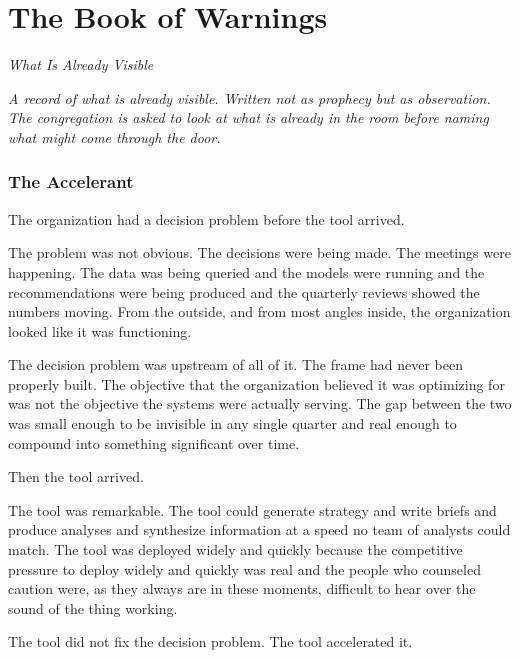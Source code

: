\chapter{The Book of Warnings}
\begin{center}
  \small\itshape What Is Already Visible
\end{center}
\vspace{0.5em}
\begin{center}
  \itshape A record of what is already visible. Written not as prophecy but as observation.\\
  The congregation is asked to look at what is already in the room before naming what might come through the door.
\end{center}
\vspace{2em}

\subsection*{The Accelerant}

The organization had a decision problem before the tool arrived.

The problem was not obvious. The decisions were being made. The meetings were happening. The data was being queried and the models were running and the recommendations were being produced and the quarterly reviews showed the numbers moving. From the outside, and from most angles inside, the organization looked like it was functioning.

The decision problem was upstream of all of it. The frame had never been properly built. The objective that the organization believed it was optimizing for was not the objective the systems were actually serving. The gap between the two was small enough to be invisible in any single quarter and real enough to compound into something significant over time.

Then the tool arrived.

The tool was remarkable. The tool could generate strategy and write briefs and produce analyses and synthesize information at a speed no team of analysts could match. The tool was deployed widely and quickly because the competitive pressure to deploy widely and quickly was real and the people who counseled caution were, as they always are in these moments, difficult to hear over the sound of the thing working.

The tool did not fix the decision problem. The tool accelerated it.

